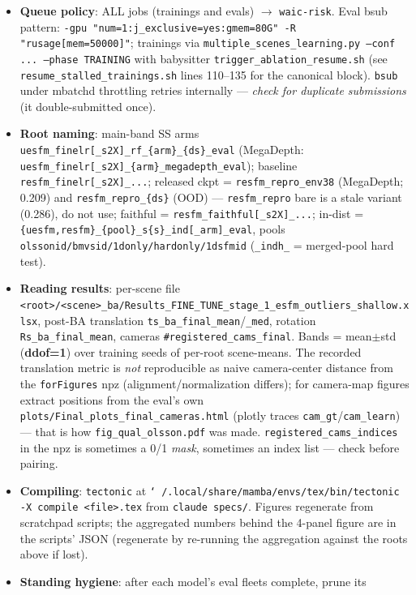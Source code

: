 \documentclass[11pt]{article}
\newcommand{\code}[1]{\texttt{\small #1}}
\begin{document}
\begin{itemize}[leftmargin=1.4em,itemsep=2pt]
\item \textbf{Queue policy}: ALL jobs (trainings and evals) $\rightarrow$ \code{waic-risk}.
Eval bsub pattern: \code{-gpu "num=1:j\_exclusive=yes:gmem=80G" -R "rusage[mem=50000]"};
trainings via \code{multiple\_scenes\_learning.py --conf ... --phase TRAINING} with babysitter
\code{trigger\_ablation\_resume.sh} (see \code{resume\_stalled\_trainings.sh} lines 110--135 for
the canonical block). \code{bsub} under mbatchd throttling retries internally —
\emph{check for duplicate submissions} (it double-submitted once).
\item \textbf{Root naming}: main-band SS arms \code{uesfm\_finelr[\_s2X]\_rf\_\{arm\}\_\{ds\}\_eval}
(MegaDepth: \code{uesfm\_finelr[\_s2X]\_\{arm\}\_megadepth\_eval}); baseline
\code{resfm\_finelr[\_s2X]\_...}; released ckpt = \code{resfm\_repro\_env38} (MegaDepth; 0.209) and
\code{resfm\_repro\_\{ds\}} (OOD) — \code{resfm\_repro} bare is a stale variant (0.286), do not use;
faithful = \code{resfm\_faithful[\_s2X]\_...}; in-dist = \code{\{uesfm,resfm\}\_\{pool\}\_s\{s\}\_ind[\_arm]\_eval},
pools \code{olssonid/bmvsid/1donly/hardonly/1dsfmid} (\code{\_indh\_} = merged-pool hard test).
\item \textbf{Reading results}: per-scene file
\code{<root>/<scene>\_ba/Results\_FINE\_TUNE\_stage\_1\_esfm\_outliers\_shallow.xlsx}, post-BA
translation \code{ts\_ba\_final\_mean}/\code{\_med}, rotation \code{Rs\_ba\_final\_mean}, cameras
\code{\#registered\_cams\_final}. Bands = mean$\pm$std (\textbf{ddof=1}) over training seeds of
per-root scene-means. The recorded translation metric is \emph{not} reproducible as naive
camera-center distance from the \code{forFigures} npz (alignment/normalization differs); for
camera-map figures extract positions from the eval's own
\code{plots/Final\_plots\_final\_cameras.html} (plotly traces \code{cam\_gt}/\code{cam\_learn}) —
that is how \code{fig\_qual\_olsson.pdf} was made. \code{registered\_cams\_indices} in the npz is
sometimes a 0/1 \emph{mask}, sometimes an index list — check before pairing.
\item \textbf{Compiling}: \code{tectonic} at
\code{\char`~/.local/share/mamba/envs/tex/bin/tectonic -X compile <file>.tex} from
\code{claude specs/}. Figures regenerate from scratchpad scripts; the aggregated numbers behind
the 4-panel figure are in the scripts' JSON (regenerate by re-running the aggregation against
the roots above if lost).
\item \textbf{Standing hygiene}: after each model's eval fleets complete, prune its

\end{itemize}
\end{document}
